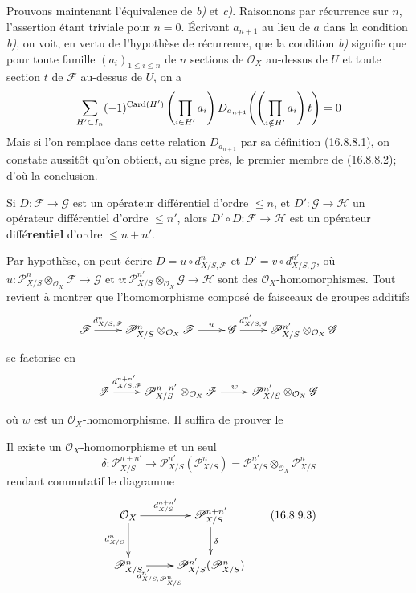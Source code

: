 Prouvons maintenant l'équivalence de \emph{b)} et \emph{c)}. Raisonnons par récurrence sur
$n$, l'assertion étant triviale pour $n=0$. Écrivant $a_{n+1}$ au lieu de $a$
dans la condition \emph{b)}, on voit, en vertu de l'hypothèse de récurrence, que la
condition \emph{b)} signifie que pour toute famille $(a_i)_{1\leq i\leq n}$ de $n$
sections de $\mathcal{O}_X$ au-dessus de $U$ et toute section $t$ de
$\mathscr{F}$ au-dessus de $U$, on a
\[
  \sum_{H'\subset I_n}(- 1)^{\operatorname{Card}(H')}
  \left(\prod_{i\in H'}a_i\right)
  D_{a_{n+1}}\!\left(\left(\prod_{i\notin H'}a_i\right)t\right)=0
\]
Mais si l'on remplace dans cette relation $D_{a_{n+1}}$ par sa définition
(16.8.8.1), on constate aussitôt qu'on obtient, au signe près, le premier
membre de (16.8.8.2); d'où la conclusion.

\begin{proposition}[16.8.9]
\label{IV.16.8.9}
Si $D:\mathscr{F}\to\mathscr{G}$ est un opérateur différentiel d'ordre
$\leq n$, et $D':\mathscr{G}\to\mathscr{H}$ un opérateur différentiel d'ordre
$\leq n'$, alors $D'\circ D:\mathscr{F}\to\mathscr{H}$ est un opérateur
diffé\textbf{rentiel} d'ordre $\leq n+n'$.
\end{proposition}

Par hypothèse, on peut écrire $D=u\circ d_{X/S,\mathscr{F}}^n$ et
$D'=v\circ d_{X/S,\mathscr{G}}^{n'}$, où
$u:\mathscr{P}_{X/S}^n\otimes_{\mathcal{O}_X}\mathscr{F}\to\mathscr{G}$ et
$v:\mathscr{P}_{X/S}^{n'}\otimes_{\mathcal{O}_X}\mathscr{G}\to\mathscr{H}$
sont des $\mathcal{O}_X$-homomorphismes. Tout revient à montrer que
l'homomorphisme composé de faisceaux de groupes additifs
\[
  \xymatrix{
    \mathscr{F}\ar[r]^-{d_{X/S,\mathscr{F}}^n}
      &\mathscr{P}_{X/S}^n\otimes_{\mathcal{O}_X}\mathscr{F}
        \ar[r]^-u
      &\mathscr{G}\ar[r]^-{d_{X/S,\mathscr{G}}^{n'}}
      &\mathscr{P}_{X/S}^{n'}\otimes_{\mathcal{O}_X}\mathscr{G}
  }
\]
se factorise en
\[
  \xymatrix{
    \mathscr{F}\ar[r]^-{d_{X/S,\mathscr{F}}^{n+n'}}
      &\mathscr{P}_{X/S}^{n+n'}\otimes_{\mathcal{O}_X}\mathscr{F}
        \ar[r]^-w
      &\mathscr{P}_{X/S}^{n'}\otimes_{\mathcal{O}_X}\mathscr{G}
  }
\]
où $w$ est un $\mathcal{O}_X$-homomorphisme. Il suffira de prouver le

\begin{lemma}[16.8.9.1]
\label{IV.16.8.9.1}
Il existe un $\mathcal{O}_X$-homomorphisme et un seul
\[
  \delta:\mathscr{P}_{X/S}^{n+n'}
  \longrightarrow
  \mathscr{P}_{X/S}^{n'}(\mathscr{P}_{X/S}^n)
  =\mathscr{P}_{X/S}^{n'}\otimes_{\mathcal{O}_X}\mathscr{P}_{X/S}^n
  \tag{16.8.9.2}
  \label{IV.16.8.9.2}
\]
rendant commutatif le diagramme
\[
  \xymatrix{
    \mathcal{O}_X\ar[r]^-{d_{X/S}^{n+n'}}\ar[d]_-{d_{X/S}^n}
      &\mathscr{P}_{X/S}^{n+n'}\ar[d]^-\delta\\
    \mathscr{P}_{X/S}^n
      \ar[r]_-{d_{X/S,\mathscr{P}_{X/S}^n}^{n'}}
      &\mathscr{P}_{X/S}^{n'}(\mathscr{P}_{X/S}^n)
  }
  \tag{16.8.9.3}
  \label{IV.16.8.9.3}
\]
\end{lemma}

